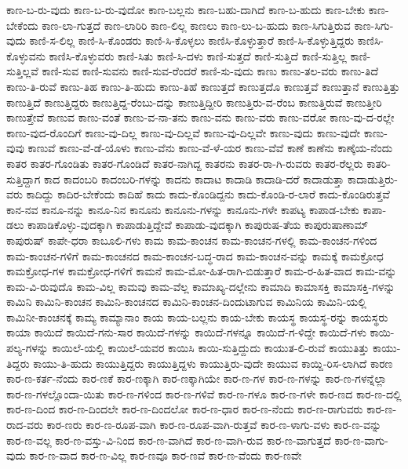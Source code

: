 {ಕಾಣ-ಬ-ರು-ವುದು
ಕಾಣ-ಬ-ರು-ವುದೋ
ಕಾಣ-ಬಲ್ಲನು
ಕಾಣ-ಬಹು-ದಾಗಿದೆ
ಕಾಣ-ಬ-ಹುದು
ಕಾಣ-ಬೇಕು
ಕಾಣ-ಬೇಕೆಂದು
ಕಾಣ-ಲಾ-ಗುತ್ತದೆ
ಕಾಣ-ಲಾರಿರಿ
ಕಾಣ-ಲಿಲ್ಲ
ಕಾಣಲು
ಕಾಣ-ಲು-ಬ-ಹುದು
ಕಾಣ-ಸಿಗುತ್ತಿರುವ
ಕಾಣ-ಸಿಗು-ವುದು
ಕಾಣಿ-ಸ-ಲಿಲ್ಲ
ಕಾಣಿ-ಸಿ-ಕೊಂಡರು
ಕಾಣಿ-ಸಿ-ಕೊಳ್ಳಲು
ಕಾಣಿಸಿ-ಕೊಳ್ಳುತ್ತಾರೆ
ಕಾಣಿ-ಸಿ-ಕೊಳ್ಳುತ್ತಿದ್ದರು
ಕಾಣಿಸಿ-ಕೊಳ್ಳುವನು
ಕಾಣಿಸಿ-ಕೊಳ್ಳುವರು
ಕಾಣಿ-ಸಿತು
ಕಾಣಿ-ಸಿ-ದಳು
ಕಾಣಿ-ಸುತ್ತದೆ
ಕಾಣಿ-ಸುತ್ತಿದೆ
ಕಾಣಿ-ಸುತ್ತಿಲ್ಲ
ಕಾಣಿ-ಸುತ್ತಿಲ್ಲವೆ
ಕಾಣಿ-ಸುವ
ಕಾಣಿ-ಸುವನು
ಕಾಣಿ-ಸುವ-ರೆಂದರೆ
ಕಾಣಿ-ಸು-ವುದು
ಕಾಣು
ಕಾಣು-ತಲ-ವರು
ಕಾಣು-ತಿದೆ
ಕಾಣು-ತಿ-ರುವೆ
ಕಾಣು-ತಿಹ
ಕಾಣು-ತಿ-ಹುದು
ಕಾಣು-ತಿಹೆ
ಕಾಣುತ್ತದೆ
ಕಾಣುತ್ತದೊ
ಕಾಣುತ್ತವೆ
ಕಾಣುತ್ತಾನೆ
ಕಾಣುತ್ತಿತ್ತು
ಕಾಣುತ್ತಿದೆ
ಕಾಣುತ್ತಿದ್ದರು
ಕಾಣುತ್ತಿದ್ದ-ರೆಂಬು-ದನ್ನು
ಕಾಣುತ್ತಿದ್ದೀರಿ
ಕಾಣುತ್ತಿರು-ವ-ರೆಂಬ
ಕಾಣುತ್ತಿರುವೆ
ಕಾಣುತ್ತೀರಿ
ಕಾಣುತ್ತೇವೆ
ಕಾಣುವ
ಕಾಣು-ವಂತೆ
ಕಾಣು-ವ-ನಾ-ತನು
ಕಾಣು-ವನು
ಕಾಣು-ವರು
ಕಾಣು-ವರೋ
ಕಾಣು-ವು-ದ-ರಲ್ಲೇ
ಕಾಣು-ವುದ-ರೊಂದಿಗೆ
ಕಾಣು-ವು-ದಿಲ್ಲ
ಕಾಣು-ವು-ದಿಲ್ಲವೆ
ಕಾಣು-ವು-ದಿಲ್ಲವೇ
ಕಾಣು-ವುದು
ಕಾಣು-ವುದೇ
ಕಾಣು-ವುವು
ಕಾಣುವೆ
ಕಾಣು-ವೆ-ಡೆ-ಯೊಳು
ಕಾಣು-ವೆನು
ಕಾಣು-ವೆ-ಳೆ-ಯರ
ಕಾಣು-ವೆವೆ
ಕಾಣೆ
ಕಾಣೆನು
ಕಾಣ್ಕೆಯ-ನೆಂದು
ಕಾತರ
ಕಾತರ-ಗೊಂಡಿತು
ಕಾತರ-ಗೊಂಡಿದೆ
ಕಾತರ-ನಾಗಿದ್ದ
ಕಾತರನು
ಕಾತರ-ರಾ-ಗಿ-ರುವರು
ಕಾತರ-ರೆಲ್ಲರು
ಕಾತರಿ-ಸುತ್ತಿದ್ದಾಗ
ಕಾದ
ಕಾದಂಬರಿ
ಕಾದಂಬರಿ-ಗಳನ್ನು
ಕಾದನು
ಕಾದಾಟ
ಕಾದಾಡಿ
ಕಾದಾಡಿ-ದರೆ
ಕಾದಾಡುತ್ತಾ
ಕಾದಾಡುತ್ತಿರು-ವರು
ಕಾದಿದ್ದು
ಕಾದಿರ-ಬೇಕೆಂದು
ಕಾದಿಹೆ
ಕಾದು
ಕಾದು-ಕೊಂಡಿದ್ದನು
ಕಾದು-ಕೊಂಡಿ-ರ-ಲಾರೆ
ಕಾದು-ಕೊಂಡಿರುತ್ತವೆ
ಕಾನ-ನವ
ಕಾನೂ-ನನ್ನು
ಕಾನೂ-ನಿನ
ಕಾನೂನು
ಕಾನೂನು-ಗಳನ್ನು
ಕಾನೂನು-ಗಳೇ
ಕಾಪಟ್ಯ
ಕಾಪಾಡ-ಬೇಕು
ಕಾಪಾ-ಡಲು
ಕಾಪಾಡಿಕೊಳ್ಳು-ವುದಕ್ಕಾಗಿ
ಕಾಪಾಡುತ್ತಿದ್ದೇವೆ
ಕಾಪಾಡು-ವುದಕ್ಕಾಗಿ
ಕಾಪುರುಷ-ತೆಯ
ಕಾಪುರುಷಾಣಾಮ್
ಕಾಪುರುಷ್
ಕಾಪೇ-ಧರಾ
ಕಾಬೂಲಿ-ಗಳು
ಕಾಮ
ಕಾಮ-ಕಾಂಚನ
ಕಾಮ-ಕಾಂಚನ-ಗಳಲ್ಲಿ
ಕಾಮ-ಕಾಂಚನ-ಗಳಿಂದ
ಕಾಮ-ಕಾಂಚನ-ಗಳಿಗೆ
ಕಾಮ-ಕಾಂಚನದ
ಕಾಮ-ಕಾಂಚನ-ಬದ್ಧ-ರಾದ
ಕಾಮ-ಕಾಂಚನ-ವನ್ನು
ಕಾಮಕ್ಕೆ
ಕಾಮಕ್ರೋಧ
ಕಾಮಕ್ರೋಧ-ಗಳ
ಕಾಮಕ್ರೋಧ-ಗಳಿಗೆ
ಕಾಮನೆ
ಕಾಮ-ಮೋ-ಹಿತ-ರಾಗಿ-ಬಿಡುತ್ತಾರೆ
ಕಾಮ-ರ-ಹಿತ-ವಾದ
ಕಾಮ-ವನ್ನು
ಕಾಮ-ವಿ-ರುವುದೊ
ಕಾಮ-ವಿಲ್ಲ
ಕಾಮವು
ಕಾಮ-ವೆಲ್ಲ
ಕಾಮಾಖ್ಯ-ದಲ್ಲೇನು
ಕಾಮಾದಿ
ಕಾಮಾಸಕ್ತಿ
ಕಾಮಾಸಕ್ತಿ-ಗಳನ್ನು
ಕಾಮಿನಿ
ಕಾಮಿನಿ-ಕಾಂಚನ
ಕಾಮಿನಿ-ಕಾಂಚನದ
ಕಾಮಿನಿ-ಕಾಂಚನ-ದಿಂದುಟಾಗುವ
ಕಾಮಿನಿಯ
ಕಾಮಿನಿ-ಯಲ್ಲಿ
ಕಾಮಿನೀ-ಕಾಂಚನಕ್ಕೆ
ಕಾಮ್ಯ
ಕಾಮ್ಯಾನಾಂ
ಕಾಯ
ಕಾಯ-ಬಲ್ಲನು
ಕಾಯ-ಬೇಕು
ಕಾಯಸ್ಥ
ಕಾಯಸ್ಥ-ರನ್ನು
ಕಾಯಸ್ಥರು
ಕಾಯಾ
ಕಾಯಿದೆ
ಕಾಯಿದೆ-ಗನು-ಸಾರ
ಕಾಯಿದೆ-ಗಳನ್ನು
ಕಾಯಿದೆ-ಗಳನ್ನೂ
ಕಾಯಿದೆ-ಗ-ಳಿದ್ದೇ
ಕಾಯಿದೆ-ಗಳು
ಕಾಯಿ-ಪಲ್ಯ-ಗಳನ್ನು
ಕಾಯಿಲೆ-ಯಲ್ಲಿ
ಕಾಯಿಲೆ-ಯವರ
ಕಾಯಿಸಿ
ಕಾಯಿ-ಸುತ್ತಿದ್ದುದು
ಕಾಯುತ-ಲಿ-ರುವೆ
ಕಾಯುತಿತ್ತು
ಕಾಯು-ತಿದ್ದರು
ಕಾಯು-ತಿ-ಹುದು
ಕಾಯುತ್ತಿದ್ದರು
ಕಾಯುತ್ತಿದ್ದಳು
ಕಾಯುತ್ತಿರು-ವುದೇ
ಕಾಯುವ
ಕಾಯ್ದಿ-ರಿಸ-ಲಾಗಿದೆ
ಕಾರಣ
ಕಾರ-ಣ-ಕರ್ತ-ನೆಂದು
ಕಾರ-ಣಕೆ
ಕಾರ-ಣಕ್ಕಾಗಿ
ಕಾರ-ಣಕ್ಕಾಗಿಯೇ
ಕಾರ-ಣ-ಗಳ
ಕಾರ-ಣ-ಗಳನ್ನು
ಕಾರ-ಣ-ಗಳನ್ನೆಲ್ಲಾ
ಕಾರ-ಣ-ಗಳಲ್ಲೊಂದಾ-ಯಿತು
ಕಾರ-ಣ-ಗಳಿಂದ
ಕಾರ-ಣ-ಗಳಿವೆ
ಕಾರ-ಣ-ಗಳೂ
ಕಾರ-ಣ-ಗಳೇ
ಕಾರ-ಣದ
ಕಾರ-ಣ-ದಲ್ಲಿ
ಕಾರ-ಣ-ದಿಂದ
ಕಾರ-ಣ-ದಿಂದಲೇ
ಕಾರ-ಣ-ದಿಂದಲೋ
ಕಾರ-ಣ-ಧಾರ
ಕಾರ-ಣ-ನೆಂದು
ಕಾರ-ಣ-ರಾಗುವರು
ಕಾರ-ಣ-ರಾದ-ವರು
ಕಾರ-ಣರು
ಕಾರ-ಣ-ರೂಪ-ವಾಗಿ
ಕಾರ-ಣ-ರೂಪ-ವಾಗಿ-ರುತ್ತವೆ
ಕಾರ-ಣ-ಳಾಗು-ವಳು
ಕಾರ-ಣ-ವನ್ನು
ಕಾರ-ಣ-ವಲ್ಲ
ಕಾರ-ಣ-ವಸ್ತು-ವಿ-ನಿಂದ
ಕಾರ-ಣ-ವಾಗಿದೆ
ಕಾರ-ಣ-ವಾಗಿ-ರುವ
ಕಾರ-ಣ-ವಾಗುತ್ತದೆ
ಕಾರ-ಣ-ವಾಗು-ವುದು
ಕಾರ-ಣ-ವಾದ
ಕಾರ-ಣ-ವಿಲ್ಲ
ಕಾರ-ಣವೂ
ಕಾರ-ಣವೆ
ಕಾರ-ಣ-ವೆಂದು
ಕಾರ-ಣವೇ
}
